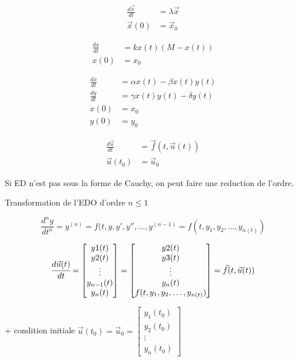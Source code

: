 \hformbar{}



\begin{align*}
    \frac{d\vec{x}}{dt} &= \lambda \vec{x} \\
    \vec{x}(0) &= \vec{x}_0
\end{align*}


\begin{align*}
    \frac{dx}{dt} &= k x(t) (M-x(t)) \\
    x(0) &= x_0
\end{align*}


\begin{align*}
    \frac{dx}{dt} &= \alpha x(t) - \beta x(t)y(t) \\
    \frac{dy}{dt} &= \gamma x(t)y(t) - \delta y(t) \\
    x(0) &= x_0 \\
    y(0) &= y_0
\end{align*}


\begin{align*}
    \frac{d\vec{u}}{dt} &= \vec{f}(t, \vec{u}(t)) \\
    \vec{u}(t_0) &= \vec{u}_0
\end{align*}

Si ED n'est pas sous la forme de Cauchy, on peut faire une reduction de l'ordre.

Transformation de l'EDO d'ordre $n \leq 1$

$$ \frac{d^ny}{dt^n} = y^{(n)} = f(t, y, y', y'', \dots,y^{(n-1)} = f(t, y_1, y_2, \dots,y_{n(t)}) $$

$$\cfrac{d\vec{u}(t)}{dt} = \begin{bmatrix}
    y1(t) \\
    y2(t) \\
    \vdots \\
    y_{n-1}(t) \\
    y_n(t)
\end{bmatrix} = \begin{bmatrix}
    y2(t) \\
    y3(t) \\
    \vdots \\
    y_n(t) \\
    f(t, y_1, y_2, \dots,y_{n(t)})
\end{bmatrix} = \vec{f}(t, \vec{u}(t))$$

+ condition initiale $\vec{u}(t_0) = \vec{u}_0 = \begin{bmatrix}
    y_1(t_0) \\
    y_2(t_0) \\
    \vdots \\
    y_n(t_0)
\end{bmatrix}$

